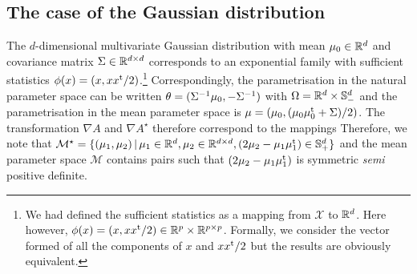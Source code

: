 \subsection{The case of the Gaussian distribution}
The $d$-dimensional multivariate Gaussian distribution with mean $\mu_0\in\mathbb R^{d}$ and covariance matrix $\Sigma\in\mathbb R^{d\times d}$ corresponds to an exponential family with sufficient statistics $\phi(x) = (x,xx^\mathrm{t}/2)$.\footnote{We had defined the sufficient statistics as a mapping from $\mathcal X$ to $\mathbb R^{d}$. Here however, $\phi(x)=(x,xx^\mathrm{t}/2)\in\mathbb R^{p}\times \mathbb R^{p\times p}$. Formally, we consider the vector formed of all the components of $x$ and $xx^\mathrm{t}/2$ but the results are obviously equivalent.} Correspondingly, the parametrisation in the natural parameter space can be written $\theta=(\Sigma^{-1} \mu_0, -\Sigma^{-1})$ with $\Omega = \mathbb R^{d}\times \mathbb S_-^{d}$ and the parametrisation in the mean parameter space is $\mu=(\mu_0,(\mu_0\mu_0^\mathrm{t}+\Sigma)/2)$. The transformation $\nabla A$ and $\nabla A^{\star}$ therefore correspond to the mappings
%
%
Therefore, we note that $\mathcal M^{\star} = \{(\mu_1,\mu_2)\,|\, \mu_1\in\mathbb R^{d}, \mu_2\in\mathbb R^{d\times d}, (2\mu_2-\mu_1\mu_1^\mathrm{t})\in\mathbb S_+^{d}\}$ and the mean parameter space $\mathcal M$ contains pairs such that $(2\mu_2-\mu_1\mu_1^\mathrm{t})$ is symmetric \emph{semi} positive definite.


